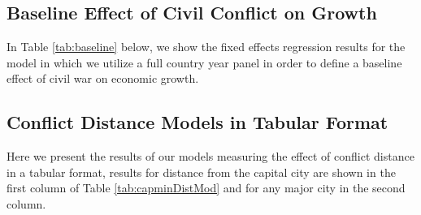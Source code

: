 
\FloatBarrier
\newpage

\subsection{Baseline Effect of Civil Conflict on Growth}

In Table \ref{tab:baseline} below, we show the fixed effects regression results for the model in which we utilize a full country year panel in order to define a baseline effect of civil war on economic growth. 


\FloatBarrier
\newpage

\subsection{Conflict Distance Models in Tabular Format}

Here we present the results of our models measuring the effect of conflict distance in a tabular format, results for distance from the capital city are shown in the first column of Table \ref{tab:capminDistMod} and for any major city in the second column.  



\FloatBarrier
\newpage

